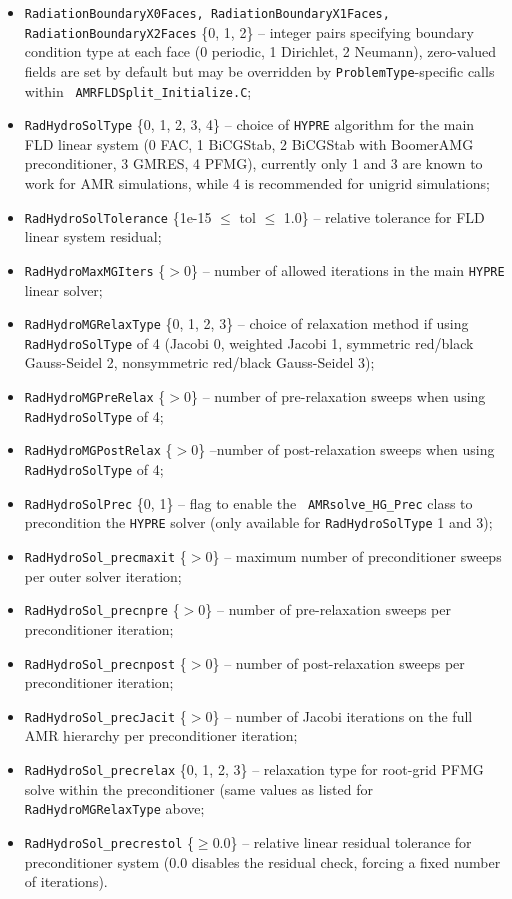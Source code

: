 \documentclass[letterpaper,10pt]{article}
\renewcommand{\(}{\left(}
\renewcommand{\)}{\right)}
\newcommand{\hypre}{{\tt HYPRE} }
\begin{document}
\begin{itemize}
\item {\tt RadiationBoundaryX0Faces, RadiationBoundaryX1Faces,
  RadiationBoundaryX2Faces} \{0, 1, 2\; [0 0]\} -- integer pairs
  specifying boundary condition type at each face (0 periodic, 1
  Dirichlet, 2 Neumann), zero-valued fields are set by default but may
  be overridden by {\tt ProblemType}-specific calls within {\tt
    AMRFLDSplit\_Initialize.C};
\item {\tt RadHydroSolType} \{0, 1, 2, 3, 4\; [1]\} -- choice of
  \hypre algorithm for the main FLD linear system (0 FAC, 1 BiCGStab,
  2 BiCGStab with BoomerAMG preconditioner, 3 GMRES, 4 PFMG),
  currently only 1 and 3 are known to work for AMR simulations, while
  4 is recommended for unigrid simulations;
\item {\tt RadHydroSolTolerance} \{1e-15 $\le$ tol $\le$ 1.0\;
  [1e-8]\} -- relative tolerance for FLD linear system residual;
\item {\tt RadHydroMaxMGIters} \{$>0$\; [200]\} -- number of allowed
  iterations in the main \hypre linear solver;
\item {\tt RadHydroMGRelaxType} \{0, 1, 2, 3\; [1]\} -- choice of
  relaxation method if using {\tt RadHydroSolType} of 4 (Jacobi 0,
  weighted Jacobi 1, symmetric red/black Gauss-Seidel 2, nonsymmetric
  red/black Gauss-Seidel 3);
\item {\tt RadHydroMGPreRelax} \{$>0$\; [1]\} -- number of pre-relaxation
  sweeps when using {\tt RadHydroSolType} of 4;
\item {\tt RadHydroMGPostRelax} \{$>0$\; [1]\} --number of
  post-relaxation sweeps when using {\tt RadHydroSolType} of 4;
\item {\tt RadHydroSolPrec} \{0, 1\; [1]\} -- flag to enable the {\tt
  AMRsolve\_HG\_Prec} class to precondition the \hypre solver (only
  available for {\tt RadHydroSolType} 1 and 3);
\item {\tt RadHydroSol\_precmaxit} \{$>0$\; [1]\} -- maximum number of
  preconditioner sweeps per outer solver iteration;
\item {\tt RadHydroSol\_precnpre} \{$>0$\; [1]\} -- number of
  pre-relaxation sweeps per preconditioner iteration;
\item {\tt RadHydroSol\_precnpost} \{$>0$\; [1]\} -- number of
  post-relaxation sweeps per preconditioner iteration;
\item {\tt RadHydroSol\_precJacit} \{$>0$\; [2]\} -- number of Jacobi
  iterations on the full AMR hierarchy per preconditioner iteration;
\item {\tt RadHydroSol\_precrelax} \{0, 1, 2, 3\; [1]\} -- relaxation
  type for root-grid PFMG solve within the preconditioner (same values
  as listed for {\tt RadHydroMGRelaxType} above;
\item {\tt RadHydroSol\_precrestol} \{$\ge 0.0$\; [0.0]\} -- relative
  linear residual tolerance for preconditioner system (0.0 disables
  the residual check, forcing a fixed number of iterations).
\end{itemize}
\end{document}
